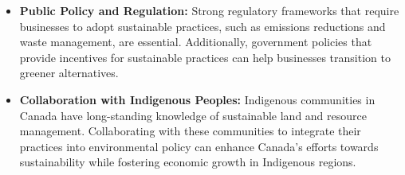 \documentclass{article}
\begin{document}
\begin{itemize}
    \item \textbf{Public Policy and Regulation:} Strong regulatory frameworks that require businesses to adopt sustainable practices, such as emissions reductions and waste management, are essential. Additionally, government policies that provide incentives for sustainable practices can help businesses transition to greener alternatives.
    
    \item \textbf{Collaboration with Indigenous Peoples:} Indigenous communities in Canada have long-standing knowledge of sustainable land and resource management. Collaborating with these communities to integrate their practices into environmental policy can enhance Canada's efforts towards sustainability while fostering economic growth in Indigenous regions.
\end{itemize}
\end{document}
